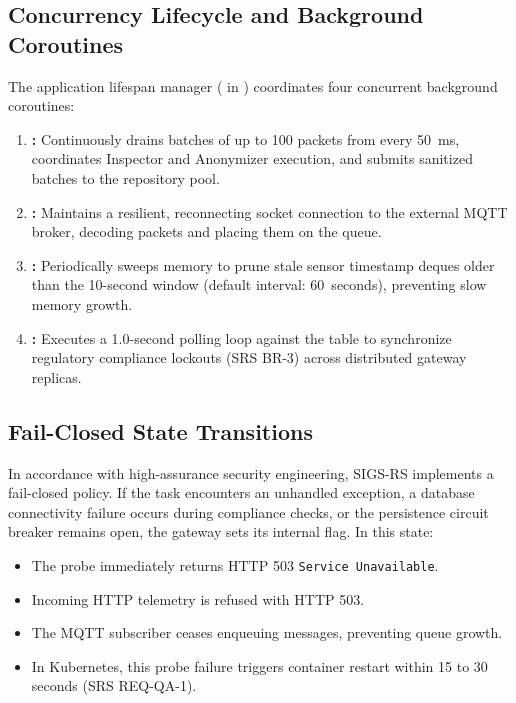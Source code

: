 \documentclass[a4paper]{article}
\begin{document}
\subsection{Concurrency Lifecycle and Background Coroutines}
The application lifespan manager ( in ) coordinates four concurrent background coroutines:
\begin{enumerate}[label=\textbf{\arabic*.}]
    \item \textbf{:} Continuously drains batches of up to 100 packets from  every 50~ms, coordinates Inspector and Anonymizer execution, and submits sanitized batches to the repository pool.
    \item \textbf{:} Maintains a resilient, reconnecting socket connection to the external MQTT broker, decoding packets and placing them on the queue.
    \item \textbf{:} Periodically sweeps memory to prune stale sensor timestamp deques older than the 10-second window (default interval: 60~seconds), preventing slow memory growth.
    \item \textbf{:} Executes a 1.0-second polling loop against the  table to synchronize regulatory compliance lockouts (SRS BR-3) across distributed gateway replicas.
\end{enumerate}

\subsection{Fail-Closed State Transitions}
In accordance with high-assurance security engineering, SIGS-RS implements a fail-closed policy. If the  task encounters an unhandled exception, a database connectivity failure occurs during compliance checks, or the persistence circuit breaker remains open, the gateway sets its internal  flag. In this state:
\begin{itemize}
    \item The  probe immediately returns HTTP 503 \texttt{Service Unavailable}.
    \item Incoming HTTP telemetry is refused with HTTP 503.
    \item The MQTT subscriber ceases enqueuing messages, preventing queue growth.
    \item In Kubernetes, this probe failure triggers container restart within 15 to 30 seconds (SRS REQ-QA-1).
\end{itemize}
\end{document}
